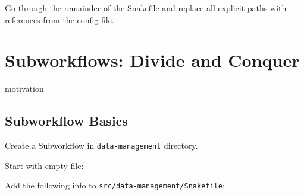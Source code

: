 \documentclass[]{book}
\newenvironment{Shaded}{\begin{snugshade}}{\end{snugshade}}
\newcommand{\KeywordTok}[1]{\textcolor[rgb]{0.13,0.29,0.53}{\textbf{{#1}}}}
\newcommand{\NormalTok}[1]{{#1}}
\theoremstyle{definition}
\theoremstyle{definition}
\theoremstyle{definition}
\theoremstyle{remark}
\begin{document}
Go through the remainder of the Snakefile and replace all explicit paths
with references from the config file.

\chapter{Subworkflows: Divide and
Conquer}\label{subworkflows-divide-and-conquer}

motivation

\section{Subworkflow Basics}\label{subworkflow-basics}

Create a Subworkflow in \texttt{data-management} directory.

Start with empty file:

\begin{Shaded}
\end{Shaded}

Add the following info to \texttt{src/data-management/Snakefile}:
\end{document}
